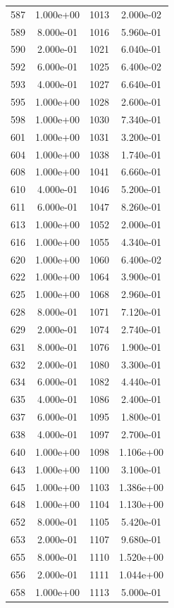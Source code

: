 \documentclass[12pt]{article}
\begin{document}
\begin{longtable}{@{}cccc@{}}
587 & 1.000e+00 & 1013 & 2.000e-02 \\
589 & 8.000e-01 & 1016 & 5.960e-01 \\
590 & 2.000e-01 & 1021 & 6.040e-01 \\
592 & 6.000e-01 & 1025 & 6.400e-02 \\
593 & 4.000e-01 & 1027 & 6.640e-01 \\
595 & 1.000e+00 & 1028 & 2.600e-01 \\
598 & 1.000e+00 & 1030 & 7.340e-01 \\
601 & 1.000e+00 & 1031 & 3.200e-01 \\
604 & 1.000e+00 & 1038 & 1.740e-01 \\
608 & 1.000e+00 & 1041 & 6.660e-01 \\
610 & 4.000e-01 & 1046 & 5.200e-01 \\
611 & 6.000e-01 & 1047 & 8.260e-01 \\
613 & 1.000e+00 & 1052 & 2.000e-01 \\
616 & 1.000e+00 & 1055 & 4.340e-01 \\
620 & 1.000e+00 & 1060 & 6.400e-02 \\
622 & 1.000e+00 & 1064 & 3.900e-01 \\
625 & 1.000e+00 & 1068 & 2.960e-01 \\
628 & 8.000e-01 & 1071 & 7.120e-01 \\
629 & 2.000e-01 & 1074 & 2.740e-01 \\
631 & 8.000e-01 & 1076 & 1.900e-01 \\
632 & 2.000e-01 & 1080 & 3.300e-01 \\
634 & 6.000e-01 & 1082 & 4.440e-01 \\
635 & 4.000e-01 & 1086 & 2.400e-01 \\
637 & 6.000e-01 & 1095 & 1.800e-01 \\
638 & 4.000e-01 & 1097 & 2.700e-01 \\
640 & 1.000e+00 & 1098 & 1.106e+00 \\
643 & 1.000e+00 & 1100 & 3.100e-01 \\
645 & 1.000e+00 & 1103 & 1.386e+00 \\
648 & 1.000e+00 & 1104 & 1.130e+00 \\
652 & 8.000e-01 & 1105 & 5.420e-01 \\
653 & 2.000e-01 & 1107 & 9.680e-01 \\
655 & 8.000e-01 & 1110 & 1.520e+00 \\
656 & 2.000e-01 & 1111 & 1.044e+00 \\
658 & 1.000e+00 & 1113 & 5.000e-01 \\

\end{longtable}
\end{document}
